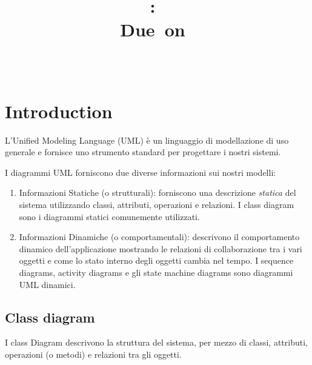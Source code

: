 \documentclass{article}
\title{
\vspace{2in}
\textmd{\textbf{\hmwkClass:\ \hmwkTitle}}\\
\normalsize\vspace{0.1in}\small{Due\ on\ \hmwkDueDate}\\
\vspace{0.1in}\large{\textit{\hmwkClassInstructor\ \hmwkClassTime}}
\vspace{3in}
}
\author{\textbf{\hmwkAuthorName}}
\date{} %
\begin{document}
\maketitle



\newpage
\tableofcontents
\newpage



\section{Introduction}
L'Unified Modeling Language (UML) \`e un linguaggio di modellazione di uso generale e fornisce uno strumento standard per progettare i nostri sistemi. 

I diagrammi UML forniscono due diverse informazioni sui nostri modelli:

\begin{enumerate}
\item Informazioni Statiche (o strutturali): forniscono una descrizione \emph{statica} del sistema utilizzando classi, attributi, operazioni e relazioni. I class diagram sono i diagrammi statici comunemente utilizzati.
\item Informazioni Dinamiche  (o comportamentali): descrivono il comportamento dinamico dell'applicazione mostrando le relazioni di collaborazione tra i vari oggetti e come lo stato interno degli oggetti cambia nel tempo. I sequence diagrams, activity diagrams e gli state machine diagrams sono diagrammi UML dinamici.
\end{enumerate}


\subsection{Class diagram}
I class Diagram descrivono la struttura del sistema, per mezzo di classi, attributi, operazioni (o metodi) e relazioni tra gli oggetti.\\
\end{document}
